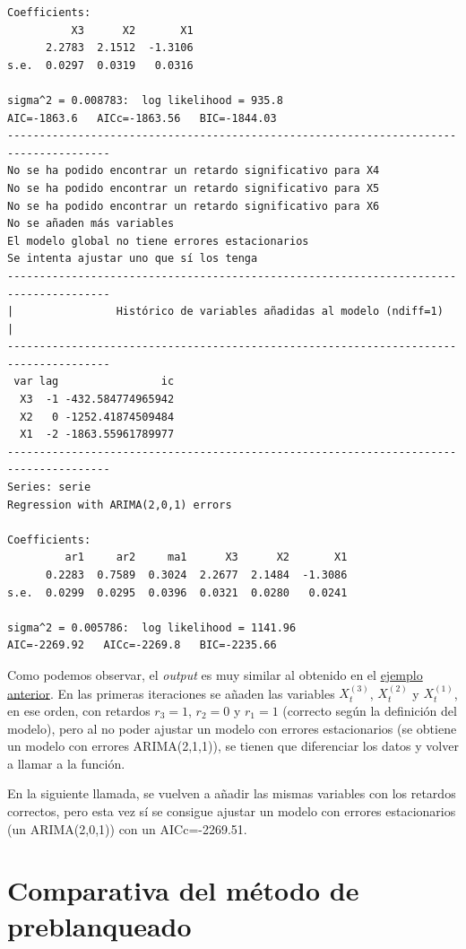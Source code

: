 \documentclass[
  12pt,
  a4paper]{article}
\begin{document}
\begin{verbatim}
Coefficients:
          X3      X2       X1
      2.2783  2.1512  -1.3106
s.e.  0.0297  0.0319   0.0316

sigma^2 = 0.008783:  log likelihood = 935.8
AIC=-1863.6   AICc=-1863.56   BIC=-1844.03
--------------------------------------------------------------------------------------
No se ha podido encontrar un retardo significativo para X4
No se ha podido encontrar un retardo significativo para X5
No se ha podido encontrar un retardo significativo para X6
No se añaden más variables
El modelo global no tiene errores estacionarios
Se intenta ajustar uno que sí los tenga
--------------------------------------------------------------------------------------
|                Histórico de variables añadidas al modelo (ndiff=1)                 |
--------------------------------------------------------------------------------------
 var lag                ic
  X3  -1 -432.584774965942
  X2   0 -1252.41874509484
  X1  -2 -1863.55961789977
--------------------------------------------------------------------------------------
Series: serie 
Regression with ARIMA(2,0,1) errors 

Coefficients:
         ar1     ar2     ma1      X3      X2       X1
      0.2283  0.7589  0.3024  2.2677  2.1484  -1.3086
s.e.  0.0299  0.0295  0.0396  0.0321  0.0280   0.0241

sigma^2 = 0.005786:  log likelihood = 1141.96
AIC=-2269.92   AICc=-2269.8   BIC=-2235.66
\end{verbatim}

Como podemos observar, el \emph{output} es muy similar al obtenido en el
\protect\hyperlink{ejemplo3}{ejemplo anterior}. En las primeras
iteraciones se añaden las variables \(X_t^{(3)}\), \(X_t^{(2)}\) y
\(X_t^{(1)}\), en ese orden, con retardos \(r_3=1\), \(r_2=0\) y
\(r_1=1\) (correcto según la definición del modelo), pero al no poder
ajustar un modelo con errores estacionarios (se obtiene un modelo con
errores ARIMA(2,1,1)), se tienen que diferenciar los datos y volver a
llamar a la función.

En la siguiente llamada, se vuelven a añadir las mismas variables con
los retardos correctos, pero esta vez sí se consigue ajustar un modelo
con errores estacionarios (un ARIMA(2,0,1)) con un AICc=-2269.51.

\newpage

\hypertarget{comparativa-del-muxe9todo-de-preblanqueado}{%
\section{Comparativa del método de
preblanqueado}\label{comparativa-del-muxe9todo-de-preblanqueado}}
\end{document}
